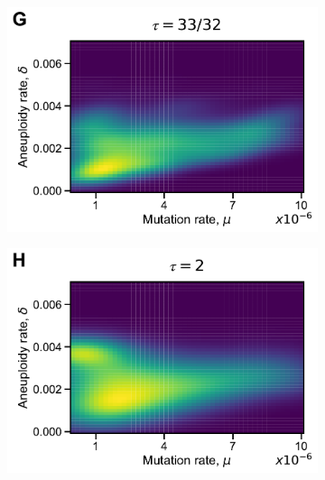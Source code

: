 \documentclass[12pt]{extarticle}
\begin{document}
\begin{figure}[p]
\begin{subfigure}{0.325\textwidth}
  \end{subfigure}
\begin{subfigure}{0.325\textwidth}
      \includegraphics[width=\textwidth]{../figures/tau-joint-G.pdf}      
  \end{subfigure}
\begin{subfigure}{0.325\textwidth}
      \includegraphics[width=\textwidth]{../figures/tau-joint-H.pdf}      
  \end{subfigure}
\begin{subfigure}{0.325\textwidth}

\end{subfigure}
\end{figure}
\end{document}
